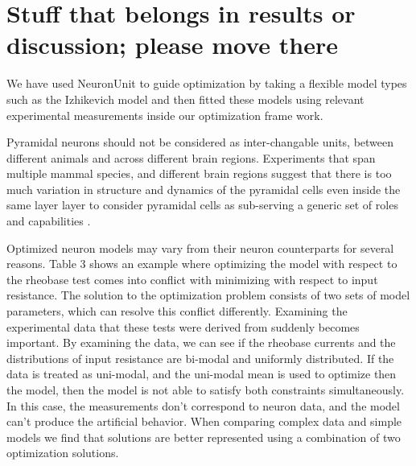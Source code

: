 \section{Stuff that belongs in results or discussion; please move there}%
We have used NeuronUnit to guide optimization by taking a flexible model types such as the Izhikevich model and then fitted these models using relevant experimental measurements inside our optimization frame work.


Pyramidal neurons should not be considered as inter-changable units, between different animals and across different brain regions. Experiments that span multiple mammal species, and different brain regions suggest that there is too much variation in structure and dynamics of the pyramidal cells even inside the same layer layer to consider pyramidal cells as sub-serving a generic set of roles and capabilities \cite{luebke2017pyramidal}. %

Optimized neuron models may vary from their neuron counterparts for several reasons. Table 3 shows an example where optimizing the model with respect to the rheobase test comes into conflict with minimizing with respect to input resistance. The solution to the optimization problem consists of two sets of model parameters, which can resolve this conflict differently. Examining the experimental data that these tests were derived from suddenly becomes important. By examining the data, we can see if the rheobase currents and the distributions of input resistance are bi-modal and uniformly distributed. If the data is treated as uni-modal, and the uni-modal mean is used to optimize then the model, then the model is not able to satisfy both constraints simultaneously. In this case, the measurements don’t correspond to neuron data, and the model can’t produce the artificial behavior. When comparing complex data and simple models we find that solutions are better represented using a combination of two optimization solutions.\\

